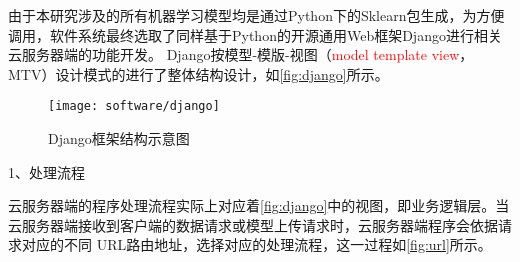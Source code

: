 由于本研究涉及的所有机器学习模型均是通过Python下的Sklearn包生成，为方便调用，软件系统最终选取了同样基于Python的开源通用Web框架Django进行相关云服务器端的功能开发\cite{django}。
Django按模型-模版-视图（\textcolor{red}{model template view}，MTV）设计模式的进行了整体结构设计\cite{django}，如\autoref{fig:django}所示。
\begin{figure}[htbp]
    \centering
    \texttt{[image: software/django]}
    \caption[Django框架结构示意图]{\label{fig:django}Django框架结构示意图}
\end{figure}

1、处理流程

云服务器端的程序处理流程实际上对应着\autoref{fig:django}中的视图，即业务逻辑层。当云服务器端接收到客户端的数据请求或模型上传请求时，云服务器端程序会依据请求对应的不同
URL路由地址，选择对应的处理流程，这一过程如\autoref{fig:url}所示。

